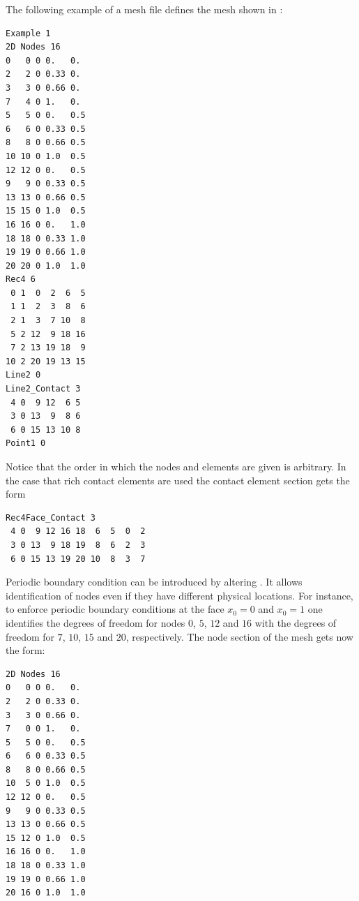 The following example of a mesh file defines the mesh shown in :
\begin{verbatim}
Example 1
2D Nodes 16
0   0 0 0.   0.
2   2 0 0.33 0.
3   3 0 0.66 0.
7   4 0 1.   0.
5   5 0 0.   0.5
6   6 0 0.33 0.5
8   8 0 0.66 0.5
10 10 0 1.0  0.5
12 12 0 0.   0.5
9   9 0 0.33 0.5
13 13 0 0.66 0.5
15 15 0 1.0  0.5
16 16 0 0.   1.0
18 18 0 0.33 1.0
19 19 0 0.66 1.0
20 20 0 1.0  1.0
Rec4 6
 0 1  0  2  6  5
 1 1  2  3  8  6
 2 1  3  7 10  8
 5 2 12  9 18 16
 7 2 13 19 18  9
10 2 20 19 13 15
Line2 0
Line2_Contact 3
 4 0  9 12  6 5
 3 0 13  9  8 6
 6 0 15 13 10 8
Point1 0
\end{verbatim}
Notice that the order in which the nodes and elements are given is arbitrary.
In the case that rich contact elements are used the contact element section gets
 the form
\begin{verbatim}
Rec4Face_Contact 3
 4 0  9 12 16 18  6  5  0  2
 3 0 13  9 18 19  8  6  2  3
 6 0 15 13 19 20 10  8  3  7
\end{verbatim}
Periodic boundary condition  can be introduced by altering .
It allows identification of nodes even if they have different physical locations. For instance, to
enforce periodic boundary conditions at the face $x_0=0$ and $x_0=1$ one identifies
the degrees of freedom for nodes $0$, $5$, $12$ and $16$ with the degrees of freedom for
$7$, $10$, $15$ and $20$, respectively. The node section of the \finley mesh gets now the form:  
\begin{verbatim}
2D Nodes 16
0   0 0 0.   0.
2   2 0 0.33 0.
3   3 0 0.66 0.
7   0 0 1.   0.
5   5 0 0.   0.5
6   6 0 0.33 0.5
8   8 0 0.66 0.5
10  5 0 1.0  0.5
12 12 0 0.   0.5
9   9 0 0.33 0.5
13 13 0 0.66 0.5
15 12 0 1.0  0.5
16 16 0 0.   1.0
18 18 0 0.33 1.0
19 19 0 0.66 1.0
20 16 0 1.0  1.0
\end{verbatim}

\clearpage

\clearpage

